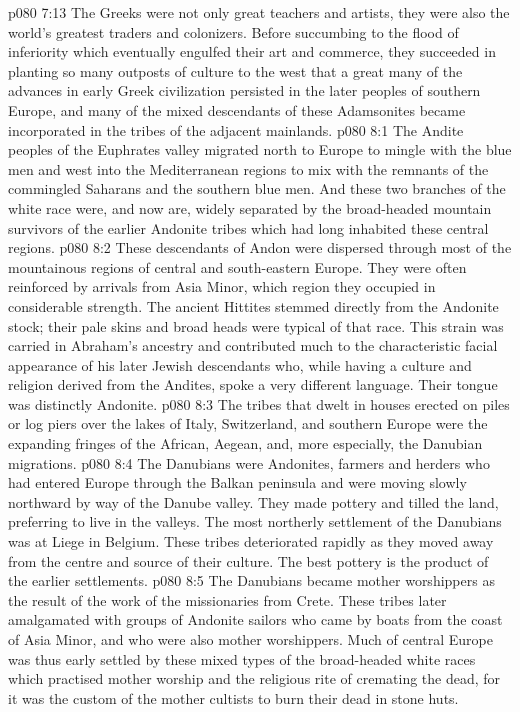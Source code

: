 \vs p080 7:13 \pc The Greeks were not only great teachers and artists, they were also the world’s greatest traders and colonizers. Before succumbing to the flood of inferiority which eventually engulfed their art and commerce, they succeeded in planting so many outposts of culture to the west that a great many of the advances in early Greek civilization persisted in the later peoples of southern Europe, and many of the mixed descendants of these Adamsonites became incorporated in the tribes of the adjacent mainlands.
\vs p080 8:1 The Andite peoples of the Euphrates valley migrated north to Europe to mingle with the blue men and west into the Mediterranean regions to mix with the remnants of the commingled Saharans and the southern blue men. And these two branches of the white race were, and now are, widely separated by the broad\hyp{}headed mountain survivors of the earlier Andonite tribes which had long inhabited these central regions.
\vs p080 8:2 These descendants of Andon were dispersed through most of the mountainous regions of central and south\hyp{}eastern Europe. They were often reinforced by arrivals from Asia Minor, which region they occupied in considerable strength. The ancient Hittites stemmed directly from the Andonite stock; their pale skins and broad heads were typical of that race. This strain was carried in Abraham’s ancestry and contributed much to the characteristic facial appearance of his later Jewish descendants who, while having a culture and religion derived from the Andites, spoke a very different language. Their tongue was distinctly Andonite.
\vs p080 8:3 The tribes that dwelt in houses erected on piles or log piers over the lakes of Italy, Switzerland, and southern Europe were the expanding fringes of the African, Aegean, and, more especially, the Danubian migrations.
\vs p080 8:4 The Danubians were Andonites, farmers and herders who had entered Europe through the Balkan peninsula and were moving slowly northward by way of the Danube valley. They made pottery and tilled the land, preferring to live in the valleys. The most northerly settlement of the Danubians was at Liege in Belgium. These tribes deteriorated rapidly as they moved away from the centre and source of their culture. The best pottery is the product of the earlier settlements.
\vs p080 8:5 The Danubians became mother worshippers as the result of the work of the missionaries from Crete. These tribes later amalgamated with groups of Andonite sailors who came by boats from the coast of Asia Minor, and who were also mother worshippers. Much of central Europe was thus early settled by these mixed types of the broad\hyp{}headed white races which practised mother worship and the religious rite of cremating the dead, for it was the custom of the mother cultists to burn their dead in stone huts.
